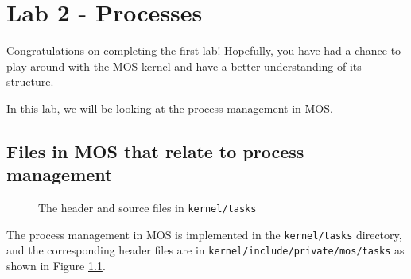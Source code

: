 \chapter{Lab 2 - Processes}

Congratulations on completing the first lab! Hopefully, you have had a chance to play
around with the MOS kernel and have a better understanding of its structure.

In this lab, we will be looking at the process management in MOS.

\section{Files in MOS that relate to process management}

\begin{figure}[ht]
    \centering
    \caption{The header and source files in \texttt{kernel/tasks}}
    \label{fig:mos-process-management-files}
\end{figure}

The process management in MOS is implemented in the \texttt{kernel/tasks} directory, and the
corresponding header files are in \texttt{kernel/include/private/mos/tasks} as shown in
Figure \ref{fig:mos-process-management-files}.

